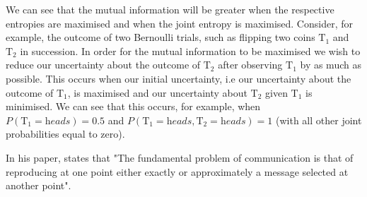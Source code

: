 We can see that the mutual information will be greater when the respective entropies are maximised and when the joint entropy is maximised. Consider, for example, the outcome of two Bernoulli trials, such as flipping two coins $\text{T}_1$ and $\text{T}_2$ in succession. In order for the mutual information to be maximised we wish to reduce our uncertainty about the outcome of $\text{T}_2$ after observing $\text{T}_1$ by as much as possible. This occurs when our initial uncertainty, i.e our uncertainty about the outcome of $\text{T}_1$, is maximised and our uncertainty about $\text{T}_2$ given $\text{T}_1$ is minimised. We can see that this occurs, for example, when $P(\text{T}_1 = \textit{heads}) = 0.5$ and $P(\text{T}_1 = \textit{heads}, \text{T}_2 = \textit{heads}) = 1$ (with all other joint probabilities equal to zero).


In his paper, \cite{shannon2001mathematical} states that "The fundamental problem of communication is that of reproducing at one point either exactly or approximately a message selected at another point".











































